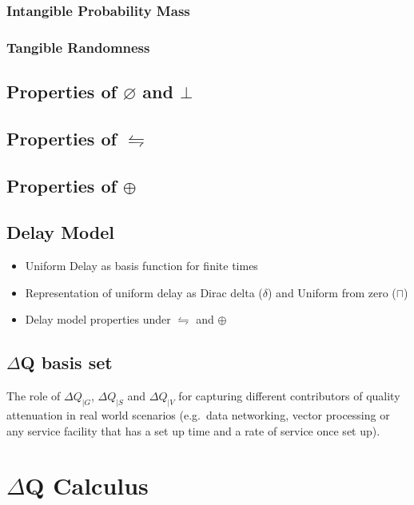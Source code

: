\documentclass[11pt,a4paper]{article}
\begin{document}
\subsubsection{Intangible Probability Mass}
\subsubsection{Tangible Randomness}
\subsection{Properties of $\varnothing$ and $\bot$}
\subsection{Properties of $\leftrightharpoons$}
\subsection{Properties of $\oplus$}
\subsection{Delay Model}
\begin{itemize}
\item Uniform Delay as basis function for finite times
\item Representation of uniform delay as Dirac delta ($\delta$) and Uniform from zero ($\sqcap$)
\item Delay model properties under $\leftrightharpoons$ and $\oplus$ 
\end{itemize}
\subsection{$\Delta$Q basis set} 
The role of $\Delta Q_{|G}$, $\Delta Q_{|S}$ and $\Delta Q_{|V}$ for
capturing different contributors of quality attenuation in real world
scenarios (e.g.\ data networking, vector processing or any service
facility that has a set up time and a rate of service once set up).
\section{$\Delta$Q Calculus}
\end{document}
